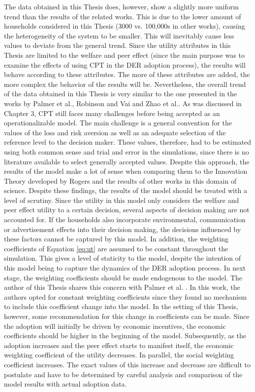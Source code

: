 The data obtained in this Thesis does, however, show a slightly more uniform trend than the results of the related works. This is due to the lower amount of households considered in this Thesis (3000 vs. 100,000s in other works), causing the heterogeneity of the system to be smaller. This will inevitably cause less values to deviate from the general trend. Since the utility attributes in this Thesis are limited to the welfare and peer effect (since the main purpose was to examine the effects of using CPT in the DER adoption process), the results will behave according to these attributes. The more of these attributes are added, the more complex the behavior of the results will be. Nevertheless, the overall trend of the data obtained in this Thesis is very similar to the one presented in the works by Palmer et al., Robinson and Vai and Zhao et al.. As was discussed in Chapter 3, CPT still faces many challenges before being accepted as an operationalizable model. The main challenge is a general convention for the values of the loss and risk aversion as well as an adequate selection of the reference level to the decision maker. These values, therefore, had to be estimated using both common sense and trial and error in the simulations, since there is no literature available to select generally accepted values. Despite this approach, the results of the model make a lot of sense when comparing them to the Innovation Theory developed by Rogers and the results of other works in this domain of science. 
\newline \newline \noindent
Despite these findings, the results of the model should be treated with a level of scrutiny. Since the utility in this model only considers the welfare and peer effect utility to a certain decision, several aspects of decision making are not accounted for. If the households also incorporate environmental, communication or advertisement effects into their decision making, the decisions influenced by these factors cannot be captured by this model. In addition, the weighting coefficients of Equation \ref{eq:ut} are assumed to be constant throughout the simulation. This gives a level of staticity to the model, despite the intention of this model being to capture the dynamics of the DER adoption process. In next stage, the weighting coefficients should be made endogenous to the model. The author of this Thesis shares this concern with Palmer et al. \cite{ItalyAdoption}. In this work, the authors opted for constant weighting coefficients since they found no mechanism to include this coefficient change into the model. In the setting of this Thesis, however, some recommendation for this change in coefficients can be made. Since the adoption will initially be driven by economic incentives, the economic coefficients should be higher in the beginning of the model. Subsequently, as the adoption increases and the peer effect starts to manifest itself, the economic weighting coefficient of the utility decreases. In parallel, the social weighting coefficient increases. The exact values of this increase and decrease are difficult to postulate and have to be determined by careful analysis and comparison of the model results with actual adoption data. 
